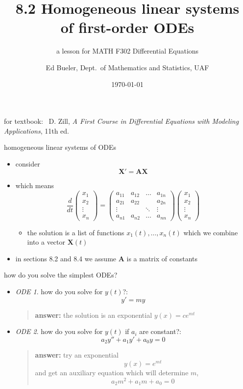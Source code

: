 \documentclass[urlcolor=blue,dvipsnames]{beamer}
\title{8.2 Homogeneous linear systems \\ of first-order ODEs}
\subtitle{a lesson for MATH F302 Differential Equations}
\author{Ed Bueler, Dept.~of Mathematics and Statistics, UAF}
\date{\tiny \today}
\newcommand{\bA}{\mathbf{A}}
\newcommand{\bX}{\mathbf{X}}
\begin{document}
\renewcommand{\thefootnote}{{\color{green} \arabic{footnote}}}

\begin{frame}
\titlepage

\centerline{\tiny for textbook: \, D. Zill, \emph{A First Course in Differential Equations with Modeling Applications}, 11th ed.}
\end{frame}


\begin{frame}{homogeneous linear systems of ODEs}

\begin{itemize}
\item consider
    $$\bX' = \bA \bX$$
\item which means
    $$\frac{d}{dt} \begin{pmatrix} x_1 \\ x_2 \\ \vdots \\ x_n \end{pmatrix} = \begin{pmatrix}
a_{11} & a_{12} & \dots & a_{1n} \\
a_{21} & a_{22} &       & a_{2n} \\
 \vdots&        & \ddots& \vdots \\
a_{n1} & a_{n2} & \dots & a_{nn}
\end{pmatrix}     \begin{pmatrix} x_1 \\ x_2 \\ \vdots \\ x_n \end{pmatrix}$$
    \begin{itemize}
    \item the solution is a list of functions $x_1(t),\dots,x_n(t)$ which we combine into a vector $\bX(t)$
    \end{itemize}
\item in sections 8.2 and 8.4 we assume $\bA$ is a matrix of constants
\end{itemize}
\end{frame}


\begin{frame}{how do you solve the simplest ODEs?}

\begin{itemize}
\item \emph{ODE 1}.  how do you solve for $y(t)$?:
    $$y'=my$$
    \begin{quote}
    \textbf{answer:}  the solution is an exponential $y(x) = c e^{mt}$
    \end{quote}
\item \emph{ODE 2}.  how do you solve for $y(t)$ if $a_i$ are constant?:
    $$a_2 y'' + a_1 y' + a_0 y = 0$$
    \begin{quote}
    \textbf{answer:}  try an exponential
        $$y(x) = e^{mt}$$
    and get an auxiliary equation which will determine $m$,
        $$a_2 m^2 + a_1 m + a_0=0$$
    \end{quote}
\end{itemize}
\end{frame}
\end{document}
